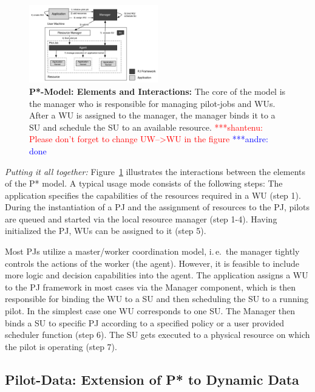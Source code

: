 \documentclass[conference,final]{IEEEtran}
\newcommand{\jhanote}[1]{ {\textcolor{red} { ***shantenu: #1 }}}
\newcommand{\alnote}[1]{ {\textcolor{blue} { ***andre: #1 }}}
\newcommand{\alnote}[1]{}
\newcommand{\jhanote}[1]{}
\newcommand{\upp}{\vspace*{-0.5em}}
\begin{document}
\begin{figure}[htbp]
    \centering    
    \includegraphics[width=0.5\textwidth]{figures/pstar_model.pdf}
    \caption{\textbf{P*-Model: Elements and Interactions:} The core of
      the model is the manager who is responsible for managing
      pilot-jobs and WUs. After a WU is assigned to the manager, the manager
      binds it to a SU and schedule the SU to an available
      resource. \jhanote{Please don't forget to change UW-->WU in the
        figure}\alnote{done}\upp\upp}
    \label{fig:figures_pstar}
\end{figure}

{\it Putting it all together:} Figure~\ref{fig:figures_pstar}
illustrates the interactions between the elements of the P* model. A
typical usage mode consists of the following steps: The application
specifies the capabilities of the resources required in a WU
(step 1). During the instantiation of a PJ and the assignment of
resources to the PJ, pilots are queued and started via the local
resource manager (step 1-4). Having initialized the PJ, WUs can be
assigned to it (step 5).


Most PJs utilize a master/worker coordination model, i.\,e.\ the
manager tightly controls the actions of the worker (the
agent). However, it is feasible to include more logic and decision
capabilities into the agent. The application assigns a WU
to the PJ framework in most cases via the Manager component, which is
then responsible for binding the WU to a SU and then scheduling the SU 
to a running pilot.  In
the simplest case one WU corresponds to one SU. The Manager then binds
a SU to specific PJ according to a specified policy or a user provided
scheduler function (step 6). The SU gets executed to a physical
resource on which the pilot is operating (step 7).


\subsection{Pilot-Data: Extension of P* to Dynamic Data\upp\upp}
\label{sec:pilot-data}
\end{document}
